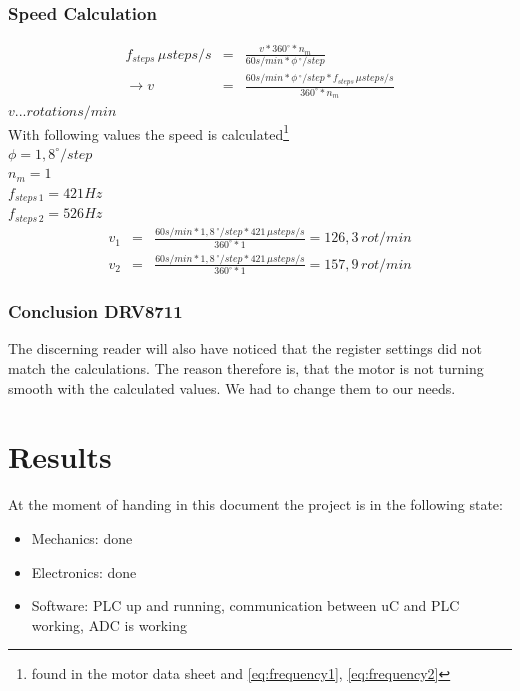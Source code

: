 \documentclass[a4paper,12pt]{scrreprt}
\begin{document}
\subsection{Speed Calculation}

\begin{eqnarray}
f_{steps} \, \mu steps /s &=& \frac{v*360^{\circ}*n_{m}}{60s/min*\phi \, ^{\circ}/step}\\
\rightarrow v &=& \frac{60 s / min*\phi \, ^{\circ}/step * f_{steps} \, \mu steps /s}{360^{\circ}*n_{m}}
\end{eqnarray}
$v ... rotations/min$\\
With following values the speed is calculated\footnote{found in the motor data sheet and \autoref{eq:frequency1}, \autoref{eq:frequency2}}\\
$\phi =1,8^{\circ}/step$\\
$n_{m}=1$\\
$f_{steps \, 1} = 421Hz$\\
$f_{steps \, 2} = 526Hz$
\begin{eqnarray}
v_{1} &=& \frac{60 s / min * 1,8 \, ^{\circ}/step * 421 \, \mu steps /s}{360^{\circ}*1}=126,3 \, rot/min\\
v_{2} &=& \frac{60 s / min * 1,8 \, ^{\circ}/step * 421 \, \mu steps /s}{360^{\circ}*1}=157,9 \, rot/min
\end{eqnarray}
\subsection{Conclusion DRV8711}
The discerning reader will also have noticed that the register settings did not match the calculations. The reason therefore is, that the motor is not turning smooth with the calculated values. We had to change them to our needs.

\chapter{Results}


At the moment of handing in this document the project is in the following state:
\begin{itemize}
\item Mechanics: done
\item Electronics:  done
\item Software: \acs{PLC} up and running, communication between \acs{uC} and \acs{PLC} working, \acs{ADC} is working
\end{itemize}

\end{document}
